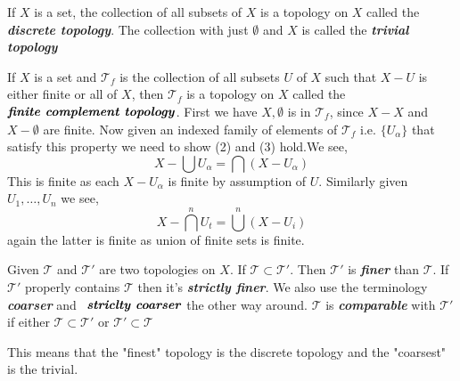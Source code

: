 \begin{eg}
    If $X$ is a set, the collection of all subsets of $X$ is a topology on $X$ called the \textbf{\emph{discrete topology}}. The collection with just $\emptyset$ and $X$ is called the \textbf{\emph{trivial topology}}
\end{eg}


\begin{eg}
    If $X$ is a set and $\mathcal{T}_f$ is the collection of all subsets $U$ of $X$ such that $X -U$ is either finite or all of $X$, then $\mathcal{T}_f$ is a topology on $X$ called the $\textbf{\emph{finite complement topology}}$. First we have $X, \emptyset$ is in $\mathcal{T}_f$, since $X - X$ and $X - \emptyset$ are finite. Now given an indexed family of elements of $\mathcal{T}_f$ i.e. $\{U_{\alpha}\}$ that satisfy this property we need to show (2) and (3) hold.We see, 
    \[
        X - \bigcup U_{\alpha} = \bigcap (X - U_{\alpha})
    \]
    This is finite as each $X - U_{\alpha}$ is finite by assumption of $U$. Similarly given $U_{1}, \dots, U_n$ we see, 
    \[
        X - \bigcap^{n}  U_t = \bigcup^{n} (X - U_i)
    \]
    again the latter is finite as union of finite sets is finite.
\end{eg}

\begin{definition}
    Given $\mathcal{T}$ and $\mathcal{T}'$ are two topologies on $X$. If $\mathcal{T} \subset \mathcal{T}'$. Then $\mathcal{T}'$ is \textbf{\emph{finer}}  than $\mathcal{T}$. If $\mathcal{T}'$  properly contains $\mathcal{T}$ then it's \textbf{\emph{strictly finer}}. We also use the terminology \textbf{\emph{coarser}} and $\textbf{\emph{ striclty coarser}}$ the other way around. $\mathcal{T}$ is \textbf{\emph{comparable}} with $\mathcal{T}'$ if either $\mathcal{T} \subset \mathcal{T}'$ or $\mathcal{T}' \subset \mathcal{T}$
\end{definition}
\begin{note}
    This means that the "finest" topology is the discrete topology and the "coarsest" is the trivial.
\end{note} 

